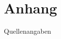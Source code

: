 \section{Anhang}

\begin{frame}[allowframebreaks]{Quellenangaben}
    \printbibliography
\end{frame}
